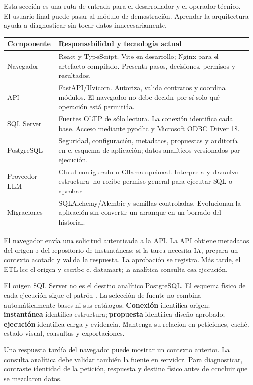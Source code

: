 Esta sección es una ruta de entrada para el desarrollador y el operador técnico. El usuario final puede pasar al módulo de demostración. Aprender la arquitectura ayuda a diagnosticar sin tocar datos innecesariamente.
\begin{tabularx}{\linewidth}{@{}p{36mm}Y@{}}
\toprule
\textbf{Componente}&\textbf{Responsabilidad y tecnología actual}\\
\midrule
Navegador&React y TypeScript. Vite en desarrollo; Nginx para el artefacto compilado. Presenta pasos, decisiones, permisos y resultados.\\
API&FastAPI/Uvicorn. Autoriza, valida contratos y coordina módulos. El navegador no debe decidir por sí solo qué operación está permitida.\\
SQL Server&Fuentes OLTP de sólo lectura. La conexión identifica cada base. Acceso mediante pyodbc y Microsoft ODBC Driver 18.\\
PostgreSQL&Seguridad, configuración, metadatos, propuestas y auditoría en el esquema de aplicación; datos analíticos versionados por ejecución.\\
Proveedor LLM&Cloud configurado u Ollama opcional. Interpreta y devuelve estructura; no recibe permiso general para ejecutar SQL o aprobar.\\
Migraciones&SQLAlchemy/Alembic y semillas controladas. Evolucionan la aplicación sin convertir un arranque en un borrado del historial.\\
\bottomrule
\end{tabularx}
El navegador envía una solicitud autenticada a la API. La API obtiene metadatos del origen o del repositorio de instantáneas; si la tarea necesita IA, prepara un contexto acotado y valida la respuesta. La aprobación se registra. Más tarde, el ETL lee el origen y escribe el datamart; la analítica consulta esa ejecución.

El origen SQL Server no es el destino analítico PostgreSQL. El esquema físico de cada ejecución sigue el patrón . La selección de fuente no combina automáticamente bases ni sus catálogos.
\textbf{Conexión} identifica origen; \textbf{instantánea} identifica estructura; \textbf{propuesta} identifica diseño aprobado; \textbf{ejecución} identifica carga y evidencia. Mantenga su relación en peticiones, caché, estado visual, consultas y exportaciones.
\begin{note}
Una respuesta tardía del navegador puede mostrar un contexto anterior. La consulta analítica debe validar también la fuente en servidor. Para diagnosticar, contraste identidad de la petición, respuesta y destino físico antes de concluir que se mezclaron datos.
\end{note}

